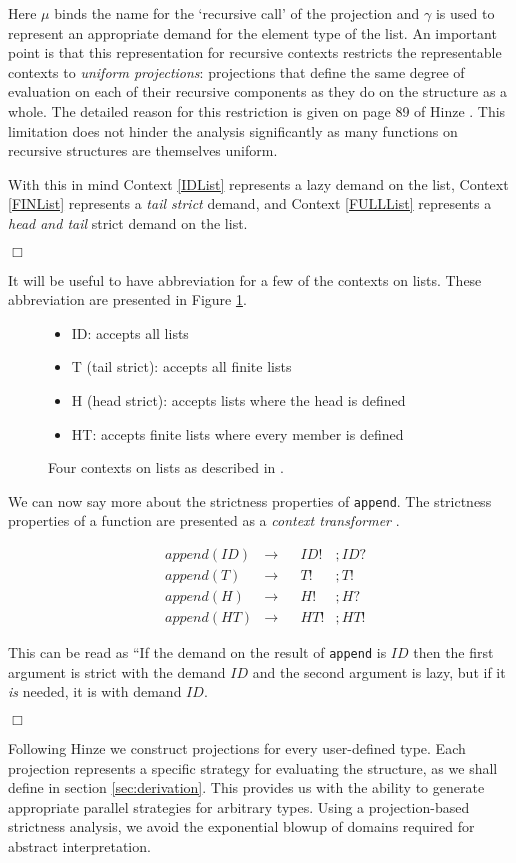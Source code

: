 Here $\mu$ binds the name for the `recursive call' of the projection and
$\gamma$ is used to represent an appropriate demand for the element type of the
list.  An important point is that this representation for recursive contexts
restricts the representable contexts to \emph{uniform projections}: projections
that define the same degree of evaluation on each of their recursive components
as they do on the structure as a whole. The detailed reason for this
restriction is given on page 89 of Hinze \citep{hinze1995projection}. This
limitation does not hinder the analysis significantly as many functions on
recursive structures are themselves uniform.

With this in mind Context \ref{IDList} represents a lazy demand on the list,
Context \ref{FINList} represents a \emph{tail strict} demand, and Context
\ref{FULLList} represents a \emph{head and tail} strict demand on the list.

\hfill$\Box$

It will be useful to have abbreviation for a few of the contexts on lists. These
abbreviation are presented in Figure \ref{contexts}.

\begin{figure}[h!]
\begin{itemize}
    \item[] ID: accepts all lists
    \item[] T (tail strict): accepts all finite lists
    \item[] H (head strict): accepts lists where the head is defined
    \item[] HT: accepts finite lists where every member is defined
\end{itemize}
\caption[Projections for the 4-point Domain]{Four contexts on lists as described in \citep{wadler1987projections}.}
\label{contexts}
\end{figure}

We can now say more about the strictness properties of \verb'append'. The
strictness properties of a function are presented as a \emph{context
transformer} \citep{hinze1995projection}. 

\begin{align*}
    &append(ID) &\rightarrow &&ID!&;ID? \\
    &append(T)  &\rightarrow &&T!&;T! \\
    &append(H)  &\rightarrow &&H!&;H? \\
    &append(HT) &\rightarrow &&HT!&;HT!
\end{align*}

This can be read as ``If the demand on the result of \verb-append- is $ID$
then the first argument is strict with the demand $ID$ and the second
argument is lazy, but if it \emph{is} needed, it is with demand $ID$.

\hfill$\Box$

Following Hinze \citep{hinze1995projection} we construct projections
for every user-defined type. Each projection represents a
specific strategy for evaluating the structure, as we shall define in section
\ref{sec:derivation}. This provides us with the ability to generate
appropriate parallel strategies for arbitrary types. Using a
projection-based strictness analysis, we avoid the exponential blowup
of domains required for abstract interpretation.
